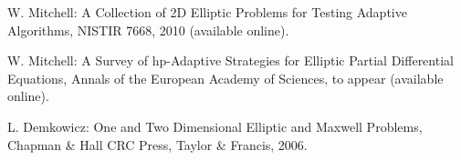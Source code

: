 \documentclass[12pt]{elsarticle}
\begin{document}
\begin{thebibliography}{[KLR73]}

W. Mitchell: A Collection of 2D Elliptic Problems for
Testing Adaptive Algorithms, NISTIR 7668, 2010 (available online).

W. Mitchell: A Survey of hp-Adaptive Strategies for Elliptic Partial Differential Equations,
Annals of the European Academy of Sciences, to appear (available online).

L. Demkowicz: One and Two Dimensional Elliptic and Maxwell Problems,
Chapman \& Hall \/ CRC Press, Taylor \& Francis, 2006.

%
%
%
\end{thebibliography}

\end{document}
